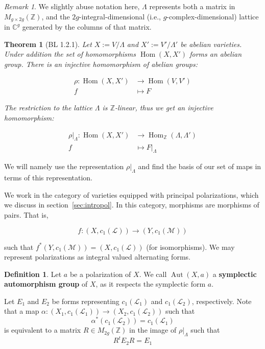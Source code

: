 \documentclass[12pt,reqno]{amsart}
\DeclareMathOperator{\Aut}{Aut}
\DeclareMathOperator{\Hom}{Hom}
\newcommand{\C}{\mathbb{C}}
\newcommand{\Z}{\mathbb{Z}}
\newcommand{\mc}{\mathcal}
\newtheorem*{thm*}{Theorem}
\theoremstyle{definition}
\newtheorem{defn}{Definition}
\theoremstyle{remark}
\newtheorem*{remark}{Remark}
\begin{document}
\begin{remark} We slightly abuse notation here, $\Lambda$ represents both a matrix in $M_{g \times 2g}(\Z)$, and the $2g$-integral-dimensional (i.e., $g$-complex-dimensional) lattice in $\C^g$ generated by the columns of that matrix.\end{remark}
 

\begin{thm*}[BL 1.2.1] Let $X:= V/\Lambda$ and $X':= V'/\Lambda'$ be abelian varieties. Under addition the set of homomorphisms $\Hom(X, X')$ forms an abelian group. There is an injective homomorphism of abelian groups: 


\begin{align*} 
\rho: \Hom(X, X') &\to \Hom(V, V') \\
f &\mapsto F
\end{align*} 

The restriction to the lattice $\Lambda$ is $\Z$-linear, thus we get an injective homomorphism: 


\begin{align*} 
\rho|_{\Lambda}: \Hom(X, X') &\to \Hom_{\Z}(\Lambda, \Lambda') \\
f &\mapsto F|_{\Lambda}
\end{align*} 


\end{thm*}


We will namely use the representation $\rho|_{\Lambda}$ and find the basis of our set of maps in terms of this representation. 

We work in the category of varieties equipped with principal polarizations, which we discuss in section~\ref{sec:intropol}. In this category, morphisms are morphisms of pairs. That is,

$$f: (X, c_1(\mc{L})) \to (Y, c_1(\mc{M}))$$

such that $f^*(Y, c_1(\mc{M})) = (X, c_1(\mc{L}))$ (for isomorphisms).  We may represent polarizations as integral valued alternating forms. 

\begin{defn} Let $a$ be a polarization of $X$. We call $\Aut(X, a)$ a \textbf{symplectic automorphism group} of $X$, as it respects the symplectic form $a$. 
\end{defn}


Let $E_1$ and $E_2$ be forms representing $c_1(\mc{L}_1)$ and $c_1(\mc{L}_2)$, respectively. Note that a map $\alpha: (X_1, c_1(\mc{L}_1)) \to (X_2, c_1(\mc{L}_2))$ such that $$\alpha^*(c_1(\mc{L}_2)) = c_1(\mc{L}_1)$$ is equivalent to a matrix $R \in M_{2g}(\Z)$ in the image of $\rho|_{\Lambda}$ such that $$R^tE_2R = E_1$$
\end{document}
